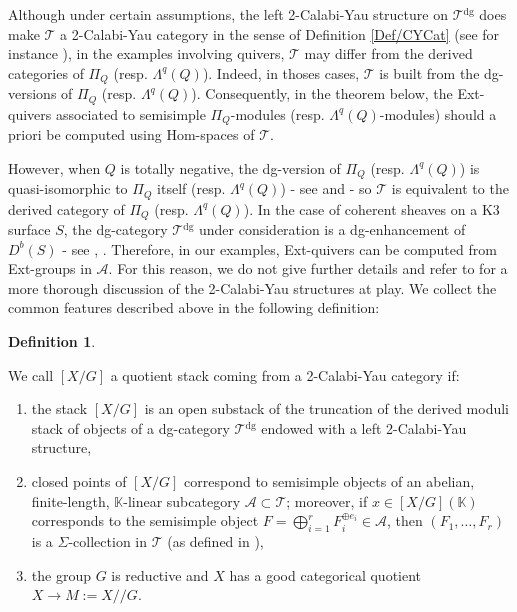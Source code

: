 \documentclass[11pt,english]{article}
\numberwithin{equation}{section}
\numberwithin{figure}{section}
\theoremstyle{definition}
\newtheorem{df}{Definition}[subsection]
\theoremstyle{plain}
\theoremstyle{remark}
\newcommand\KK{\mathbb{K}}
\newcommand\git{/\!\!/}
\begin{document}
Although under certain assumptions, the left 2-Calabi-Yau structure
on $\mathcal{T}{}^{\mathrm{dg}}$ does make $\mathcal{T}$ a 2-Calabi-Yau
category in the sense of Definition \ref{Def/CYCat} (see for instance
\cite[\S 10.1.]{KW21}), in the examples involving quivers, $\mathcal{T}$
may differ from the derived categories of $\Pi_{Q}$ (resp. $\Lambda^{q}(Q)$).
Indeed, in thoses cases, $\mathcal{T}$ is built from the dg-versions
of $\Pi_{Q}$ (resp. $\Lambda^{q}(Q)$). Consequently, in the theorem
below, the Ext-quivers associated to semisimple $\Pi_{Q}$-modules
(resp. $\Lambda^{q}(Q)$-modules) should a priori be computed using
Hom-spaces of $\mathcal{T}$.

However, when $Q$ is totally negative, the dg-version of $\Pi_{Q}$
(resp. $\Lambda^{q}(Q)$) is quasi-isomorphic to $\Pi_{Q}$ itself
(resp. $\Lambda^{q}(Q)$) - see \cite[\S 4.2.]{Kel08} and \cite[Prop. 4.4.]{KS23a}
- so $\mathcal{T}$ is equivalent to the derived category of $\Pi_{Q}$
(resp. $\Lambda^{q}(Q)$). In the case of coherent sheaves on a K3
surface $S$, the dg-category $\mathcal{T}{}^{\mathrm{dg}}$ under
consideration is a dg-enhancement of $D^{b}(S)$ - see \cite[\S 5.2.]{BD19},
\cite[\S 7.2.5.]{Dav21a}. Therefore, in our examples, Ext-quivers
can be computed from Ext-groups in $\mathcal{A}$. For this reason,
we do not give further details and refer to \cite{Dav21a} for a more
thorough discussion of the 2-Calabi-Yau structures at play. We collect
the common features described above in the following definition:

\begin{df} \label{Def/QuotStack2CY}

We call $[X/G]$ a quotient stack coming from a 2-Calabi-Yau category
if:
\begin{enumerate}
\item the stack $[X/G]$ is an open substack of the truncation of the derived
moduli stack of objects of a dg-category $\mathcal{T}{}^{\mathrm{dg}}$
endowed with a left 2-Calabi-Yau structure,
\item closed points of $[X/G]$ correspond to semisimple objects of an abelian,
finite-length, $\KK$-linear subcategory $\mathcal{A}\subset\mathcal{T}$;
moreover, if $x\in[X/G](\KK)$ corresponds to the semisimple object
$F=\bigoplus_{i=1}^{r}F_{i}^{\oplus e_{i}}\in\mathcal{A}$, then $(F_{1},\ldots,F_{r})$
is a $\Sigma$-collection in $\mathcal{T}$ (as defined in \cite[\S 1.3.]{Dav21a}),
\item the group $G$ is reductive and $X$ has a good categorical quotient
$X\rightarrow M:=X\git G$.
\end{enumerate}
\end{df}
\end{document}
